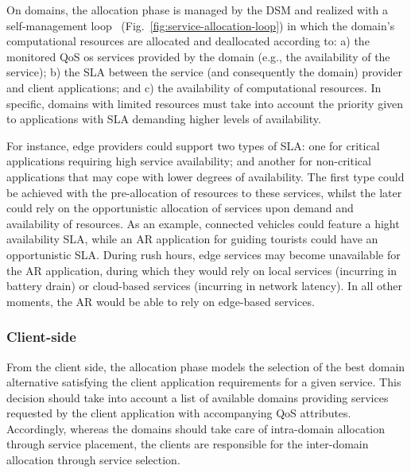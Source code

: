 On domains, the allocation phase is managed by the DSM and realized with a self-management loop~\cite{kephart2003vision} (Fig.~\ref{fig:service-allocation-loop}) in which the domain's computational resources are allocated and deallocated according to: a) the monitored QoS os services provided by the domain (e.g., the availability of the service); b) the SLA between the service (and consequently the domain) provider and client applications; and c) the availability of computational resources. In specific, domains with limited resources must take into account the priority given to applications with SLA demanding higher levels of availability. 

For instance, edge providers could support two types of SLA: one for critical applications requiring high service availability; and another for non-critical applications that may cope with lower degrees of availability. The first type could be achieved with the pre-allocation of resources to these services, whilst the later could rely on the opportunistic allocation of services upon demand and availability of resources. As an example, connected vehicles could feature a hight availability SLA, while an AR application for guiding tourists could have an opportunistic SLA. During rush hours, edge services may become unavailable for the AR application, during which they would rely on local services (incurring in battery drain) or cloud-based services (incurring in network latency). In all other moments, the AR would be able to rely on edge-based services. 



\subsubsection{Client-side} From the client side, the allocation phase models the selection of the best domain alternative satisfying the client application requirements for a given service.
This decision should take into account a list of available domains providing services requested by the client application with accompanying QoS attributes. Accordingly, whereas the domains should take care of intra-domain allocation through service placement, the clients are responsible for the inter-domain allocation through service selection.

